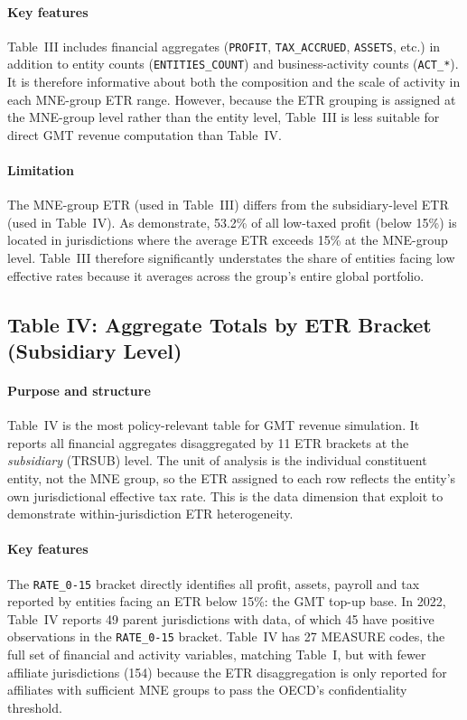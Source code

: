 \documentclass[11pt,a4paper]{article}
\newcommand{\code}[1]{\texttt{#1}}
\begin{document}
\paragraph{Key features}
Table~III includes financial aggregates (\code{PROFIT}, \code{TAX\_ACCRUED}, \code{ASSETS}, etc.) in addition to entity counts (\code{ENTITIES\_COUNT}) and business-activity counts (\code{ACT\_*}). It is therefore informative about both the composition and the scale of activity in each MNE-group ETR range. However, because the ETR grouping is assigned at the MNE-group level rather than the entity level, Table~III is less suitable for direct GMT revenue computation than Table~IV.

\paragraph{Limitation}
The MNE-group ETR (used in Table~III) differs from the subsidiary-level ETR (used in Table~IV). As \citet{hugger2025} demonstrate, 53.2\% of all low-taxed profit (below 15\%) is located in jurisdictions where the average ETR exceeds 15\% at the MNE-group level. Table~III therefore significantly understates the share of entities facing low effective rates because it averages across the group's entire global portfolio.

\subsection{Table IV: Aggregate Totals by ETR Bracket (Subsidiary Level)}\label{sec:table4}

\paragraph{Purpose and structure}
Table~IV is the most policy-relevant table for GMT revenue simulation. It reports all financial aggregates disaggregated by 11 ETR brackets at the \emph{subsidiary} (TRSUB) level. The unit of analysis is the individual constituent entity, not the MNE group, so the ETR assigned to each row reflects the entity's own jurisdictional effective tax rate. This is the data dimension that \citet{hugger2025} exploit to demonstrate within-jurisdiction ETR heterogeneity.

\paragraph{Key features}
The \code{RATE\_0-15} bracket directly identifies all profit, assets, payroll and tax reported by entities facing an ETR below 15\%: the GMT top-up base. In 2022, Table~IV reports 49 parent jurisdictions with data, of which 45 have positive observations in the \code{RATE\_0-15} bracket. Table~IV has 27 MEASURE codes, the full set of financial and activity variables, matching Table~I, but with fewer affiliate jurisdictions (154) because the ETR disaggregation is only reported for affiliates with sufficient MNE groups to pass the OECD's confidentiality threshold.
\end{document}
